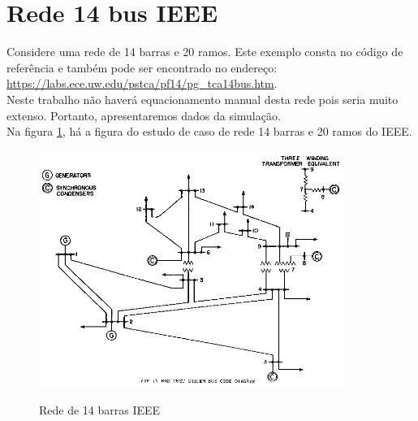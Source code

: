 \section{Rede 14 bus IEEE}
\label{SectionRede14barras}
Considere uma rede de 14 barras e 20 ramos. Este exemplo consta no código de referência e também pode ser encontrado no endereço: \href{https://labs.ece.uw.edu/pstca/pf14/pg\_tca14bus.htm}{https://labs.ece.uw.edu/pstca/pf14/pg\_tca14bus.htm}.\\
Neste trabalho não haverá equacionamento manual desta rede pois seria muito extenso. Portanto, apresentaremos dados da simulação.\\
Na figura \ref{FigRede14barras}, há a figura do estudo de caso de rede 14 barras e 20 ramos do IEEE.
\begin{figure}[!htb]
\caption{Rede de 14 barras IEEE}
\centering %
\includegraphics[width=10cm]{figuras/14bus.jpg} 
\label{FigRede14barras}
\end{figure}

